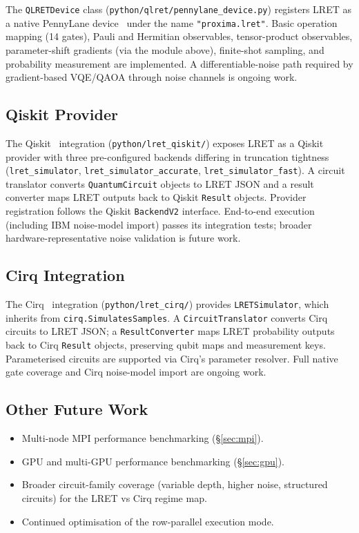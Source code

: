 \documentclass[11pt,a4paper]{article}
\begin{document}
The \texttt{QLRETDevice} class (\texttt{python/qlret/pennylane\_device.py})
registers LRET as a native PennyLane device~\cite{bergholm2018pennylane} under the
name \texttt{"proxima.lret"}. Basic operation mapping (14 gates), Pauli and Hermitian
observables, tensor-product observables, parameter-shift gradients (via the module
above), finite-shot sampling, and probability measurement are implemented. A
differentiable-noise path required by gradient-based VQE/QAOA through noise channels
is ongoing work.

\subsection{Qiskit Provider}

The Qiskit~\cite{javadi2024qiskit} integration (\texttt{python/lret\_qiskit/}) exposes
LRET as a Qiskit provider with three pre-configured backends differing in truncation
tightness (\texttt{lret\_simulator}, \texttt{lret\_simulator\_accurate},
\texttt{lret\_simulator\_fast}). A circuit translator converts
\texttt{QuantumCircuit} objects to LRET JSON and a result converter maps LRET outputs
back to Qiskit \texttt{Result} objects. Provider registration follows the Qiskit
\texttt{BackendV2} interface. End-to-end execution (including IBM noise-model import)
passes its integration tests; broader hardware-representative noise validation is
future work.

\subsection{Cirq Integration}

The Cirq~\cite{cirq} integration (\texttt{python/lret\_cirq/}) provides
\texttt{LRETSimulator}, which inherits from \texttt{cirq.SimulatesSamples}. A
\texttt{CircuitTranslator} converts Cirq circuits to LRET JSON; a
\texttt{ResultConverter} maps LRET probability outputs back to Cirq \texttt{Result}
objects, preserving qubit maps and measurement keys. Parameterised circuits are
supported via Cirq's parameter resolver. Full native gate coverage and Cirq
noise-model import are ongoing work.

\subsection{Other Future Work}

\begin{itemize}
  \item Multi-node MPI performance benchmarking (\S\ref{sec:mpi}).
  \item GPU and multi-GPU performance benchmarking (\S\ref{sec:gpu}).
  \item Broader circuit-family coverage (variable depth, higher noise, structured
        circuits) for the LRET vs Cirq regime map.
  \item Continued optimisation of the row-parallel execution mode.
\end{itemize}
\end{document}
